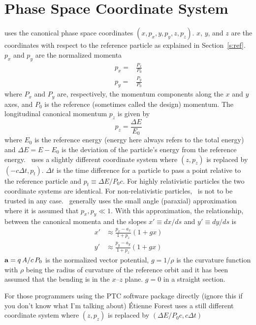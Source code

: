 \section{Phase Space Coordinate System}
\label{s:phase_space_coords}

\bmad uses the canonical phase space coordinates 
$(x, p_x, y, p_y, z, p_z)$. $x$, $y$, and $z$ are the
coordinates with respect to the reference particle as explained in
Section~\ref{s:ref}. $p_x$ and $p_y$ are the normalized momenta
\begin{align}
  p_x = &\frac{P_x}{P_0} \\
  p_y = &\frac{P_y}{P_0}
\end{align}
where $P_x$ and $P_y$ are, respectively, the momentum components along the $x$ and
$y$ axes, and $P_0$ is the reference (sometimes called the
design) momentum. The longitudinal canonical momentum $p_z$ is given by
\begin{equation}
  p_z = \frac{\Delta E}{E_0}
\end{equation}
where $E_0$ is the reference energy (energy here always refers to the 
total energy) and $\Delta E = E - E_0$ is the
deviation of the particle's energy from the reference energy. \mad\ uses
a slightly different coordinate system where $(z, p_z)$ is
replaced by $(-c\Delta t, p_t)$. $\Delta t$ is the time
difference for a particle to pass a point relative to the reference
particle and $p_t \equiv \Delta E / P_0 c$. For highly relativistic
particles the two coordinate systems are identical. For
non-relativistic particles, \bmad\ is not to be trusted in any
case. \bmad\ generally uses the small angle (paraxial) approximation
where it is assumed that $p_x, p_y \ll 1$. With this approximation, the
relationship, between the canonical momenta and the slopes $x' \equiv dx/ds$
and $y' \equiv dy/ds$ is
\begin{align}
  x' &\approx \frac{p_x - a_x}{1 + p_z} (1 + g x) \\
  y' &\approx \frac{p_y - a_y}{1 + p_z} (1 + g x) 
\end{align}
${\bf a} = q \, A / c \, P_0$ is the normalized vector potential,
$g = 1/\rho$ is the curvature function with $\rho$ being the radius
of curvature of the reference orbit and it has been assumed that the 
bending is in the $x$--$z$ plane. $g = 0$ in a straight section.

For those programmers using the PTC software package directly (ignore
this if you don't know what I'm talking about) \'Etienne Forest uses a still
different coordinate system where $(z, p_z)$ is replaced by
$(\Delta E/P_0 c, c \Delta t)$